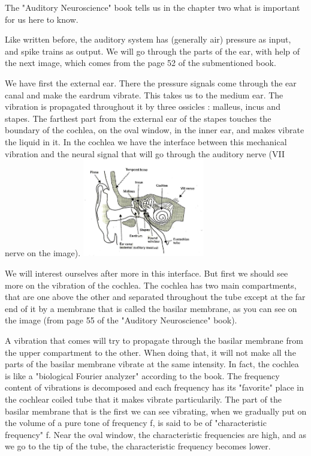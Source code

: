 The "Auditory Neuroscience" book \cite{AuditoryNeuroscience} tells us in the 
chapter two what is important for us here to know. 

Like written before, the auditory system has (generally air) pressure as input, 
and spike trains as output. We will go through the parts of the ear, with help 
of the next image, which comes from the page 52 of the submentioned book. 

We have first the external ear. There the pressure signals come through the ear 
canal and make the eardrum vibrate. This takes us to the medium ear. 
The vibration is propagated throughout it by three ossicles : malleus, incus 
and stapes. The farthest part from the external ear of the stapes touches the 
boundary of the cochlea, on the oval window, in the inner ear, and makes vibrate
 the liquid in it. 
In the cochlea we have the interface between this mechanical vibration 
and the neural signal that will go through the auditory nerve 
(VII nerve on the image).
%
\includegraphics[width=0.4\textwidth]{images/ear-aud52-level.jpg}

We will interest ourselves after more in this interface. But first we should see 
more on the vibration of the cochlea. The cochlea has two main compartments, 
that are one above the other and separated 
throughout the tube except at the far end of it by a membrane that is called 
the basilar membrane, as you can see on the image 
(from page 55 of the "Auditory Neuroscience" book).


A vibration that comes will try to propagate through the basilar membrane from 
the upper compartment to the other. When doing that, it will not make all 
the parts of the basilar membrane vibrate at the same intensity. 
In fact, the cochlea is like a "biological Fourier analyzer" according to the book. 
The frequency content of vibrations is decomposed and each frequency has its 
"favorite" place in the cochlear coiled tube that it makes vibrate particularily. 
The part of the basilar membrane that is the first we can see vibrating, 
when we gradually put on the volume of a pure tone of frequency f, is said to be of 
"characteristic frequency" f. Near the oval window, the characteristic 
frequencies are high, and as we go to the tip of the tube, 
the characteristic frequency becomes lower.

